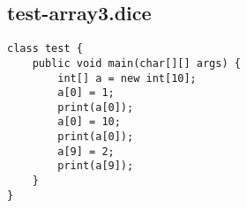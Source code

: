 \subsection{test-array3.dice}
\begin{verbatim}
class test {
	public void main(char[][] args) {
		int[] a = new int[10];
		a[0] = 1;
		print(a[0]);
		a[0] = 10;
		print(a[0]);
		a[9] = 2;
		print(a[9]);
	}
}
\end{verbatim}